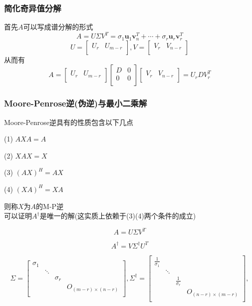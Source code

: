 \documentclass{article}
\newcommand{\ve}{\boldsymbol}
\begin{document}
\begin{CJK}{UTF8}{gkai}
\subsubsection{简化奇异值分解}
首先$A$可以写成谱分解的形式
\[A = U \Sigma V^T = \sigma_1 \ve{u}_1 \ve{v}_n^T + \cdots + \sigma_r \ve{u}_r \ve{v}_r^T \]
\[U = \begin{bmatrix}
    U_{r} & U_{m - r}\\
\end{bmatrix}, V = \begin{bmatrix}
    V_{r} & V_{n - r}\\
\end{bmatrix}\]
从而有
\[A = \begin{bmatrix}
    U_{r} & U_{m - r}\\
\end{bmatrix}
\begin{bmatrix}
    D&0\\
    0&0\\
\end{bmatrix}
\begin{bmatrix}
    V_{r} & V_{n - r}\\
\end{bmatrix} = U_{r} D V_{r}^T\]
\subsubsection{Moore-Penrose逆(伪逆)与最小二乘解\\}

Moore-Penrose逆具有的性质包含以下几点

(1) $AXA = A$

(2) $XAX = X$

(3) $(AX)^H = AX$

(4) $(XA)^H = XA$

则称$X$为$A$的M-P逆\\

可以证明$A^\dagger$是唯一的解(这实质上依赖于(3)(4)两个条件的成立)

\[A = U \Sigma V^T\]

\[A^{\dagger} = V \Sigma^{\dagger} U^T \]

\[  \Sigma = \begin{bmatrix}
    \sigma_1 &&&\\
    &\ddots&&\\
    &&\sigma_r&\\
    &&&O_{(m- r)\times (n - r)}\\
\end{bmatrix},
\Sigma^{\dagger} = 
\begin{bmatrix}
    \frac{1}{\sigma_1} &&&\\
    &\ddots&&\\
    &&\frac{1}{\sigma_r}&\\
    &&&O_{(n- r)\times (m - r)}\\
\end{bmatrix},\]


\end{CJK}
\end{document}
